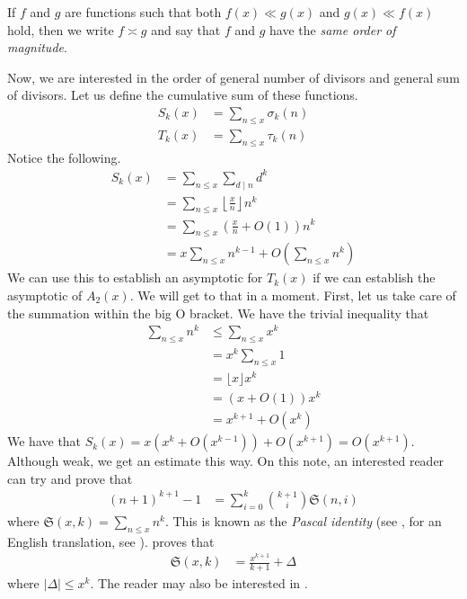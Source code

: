 \documentclass[elemannt.tex]{subfile}
\begin{document}
		\begin{definition}
			If $f$ and $g$ are functions such that both $f(x)\ll g(x)$ and $g(x)\ll f(x)$ hold, then we write $f\asymp g$ and say that $f$ and $g$ have the \textit{same order of magnitude}.
		\end{definition}\par
	Now, we are interested in the order of general number of divisors and general sum of divisors. Let us define the cumulative sum of these functions.
		\begin{align*}
			S_{k}(x)
				& = \sum_{n\leq x}\sigma_{k}(n)\\
			T_{k}(x)
				& = \sum_{n\leq x}\tau_{k}(n)
		\end{align*}
	Notice the following.
		\begin{align*}
			S_{k}(x)
				& = \sum_{n\leq x}\sum_{d\mid n}d^{k}\\
				& = \sum_{n\leq x}\left\lfloor{\frac{x}{n}}\right\rfloor n^{k}\\
				& = \sum_{n\leq x}\left(\frac{x}{n}+O(1)\right)n^{k}\\
				& = x\sum_{n\leq x}n^{k-1}+O\left(\sum_{n\leq x}n^{k}\right)
		\end{align*}
	We can use this to establish an asymptotic for $T_{k}(x)$ if we can establish the asymptotic of $A_{2}(x)$. We will get to that in a moment. First, let us take care of the summation within the big O bracket. We have the trivial inequality that
		\begin{align*}
			\sum_{n\leq x}n^{k}
				& \leq \sum_{n\leq x}x^{k}\\
				& = x^{k}\sum_{n\leq x}1\\
				& = \lfloor{x}\rfloor x^{k}\\
				& = (x+O(1))x^{k}\\
				& = x^{k+1}+O(x^{k})
		\end{align*}
	We have that $S_{k}(x)=x\left(x^{k}+O(x^{k-1})\right)+O(x^{k+1})=O(x^{k+1})$. Although weak, we get an estimate this way. On this note, an interested reader can try and prove that
		\begin{align*}
			(n+1)^{k+1}-1
				& =\sum_{i=0}^{k}\binom{k+1}{i}\mathfrak{S}(n,i)
		\end{align*}
	where $\mathfrak{S}(x,k)=\sum_{n\leq x}n^{k}$. This is known as the \textit{Pascal identity} (see \textcite{pascal_1964}, for an English translation, see \textcite{knoebel_laubenbacher_lodder_pengelley_2007}). \textcite[Chapter II, Theorem $1$]{lehmer_1900} proves that
		\begin{align}
			\mathfrak{S}(x,k)
				& = \frac{x^{k+1}}{k+1}+\Delta\label{eqn:lehmers}
		\end{align}
	where $|\Delta|\leq x^{k}$. The reader may also be interested in \textcite{kieren_macmillan_jonathan_sondow_2011}.
\end{document}
